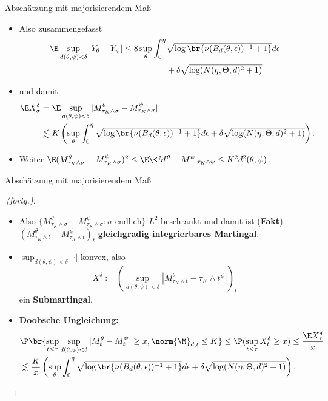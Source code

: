 \begin{frame}{Abschätzung mit majorisierendem Maß}
    \begin{proofs}
        \begin{itemize}
            \item Also zusammengefasst  \small \begin{align*}
                \E \sup_{d(\theta, \psi) < \delta}|Y_\theta-Y_\psi| \leq  8 \sup_{\theta} \int_0^\eta &\sqrt{\log\br{\nu(B_d(\theta, \epsilon))^{-1} + 1}} d\epsilon \\ &+ \delta \sqrt{\log(N(\eta, \Theta, d)^2 + 1)}
            \end{align*}
            \item \normalsize und damit \small \begin{align*}
                \E X_\sigma^\delta &= \E \sup_{d(\theta, \psi) < \delta}|M_{\tau_K\wedge\sigma}^\theta - M_{\tau_K\wedge\sigma}^\psi| \\&\lesssim  K \left(\sup_{\theta} \int_0^\eta \sqrt{\log\br{\nu(B_d(\theta, \epsilon))^{-1} + 1}} d\epsilon + \delta \sqrt{\log(N(\eta, \Theta, d)^2 + 1)}\right).
            \end{align*}
            \item \normalsize Weiter \small$\E (M_{\tau_K\wedge\sigma}^\theta - M_{\tau_K\wedge\sigma}^\psi)^2 \leq \E \<M^\theta-M^\psi\>_{\tau_K \wedge \psi} \leq K^2d^2(\theta,\psi)$. 
        \end{itemize}
    \end{proofs}
\end{frame}
\begin{frame}{Abschätzung mit majorisierendem Maß}
    \begin{proof}[\proofname \,(fortg.)]
    \begin{itemize}
           \item \normalsize Also $\{M_{\tau_K\wedge\sigma}^\theta - M_{\tau_K\wedge\sigma}^\psi: \sigma \text{ endlich} \}$ $L^2$-beschränkt und damit ist (\textbf{Fakt}) $(M_{\tau_K\wedge t}^\theta - M_{\tau_K\wedge t}^\psi)_t$ \textbf{gleichgradig integrierbares Martingal}. 
           \item $\sup_{d(\theta, \psi) < \delta} |\cdot|$ konvex, also \small \[
X^\delta := (\sup_{d(\theta, \psi) < \delta} |M_{\tau_K \wedge t}^\theta - {\tau_K \wedge t}^\psi|)_t\] \normalsize ein \textbf{Submartingal}.
\item \textbf{Doobsche Ungleichung:}  \small \begin{align*}
    &\P\br{\sup_{t \leq \tau} \sup_{d(\theta, \psi) < \delta}  |M_t^\theta - M_t^\psi| \geq x, \norm{\M}_{d,t} \leq K} \leq \P(\sup_{t \leq \tau} X_t^\delta \geq x) \leq \frac{\E X_\tau^\delta}{x}  \\ &\lesssim  \frac{K}{x} \left(\sup_{\theta} \int_0^\eta \sqrt{\log\br{\nu(B_d(\theta, \epsilon))^{-1} + 1}} d\epsilon + \delta \sqrt{\log(N(\eta, \Theta, d)^2 + 1)}\right). \end{align*}
    \end{itemize}  \end{proof}
\end{frame}

